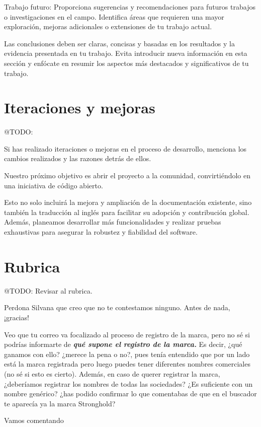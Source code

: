 Trabajo futuro: Proporciona sugerencias y recomendaciones para futuros trabajos o investigaciones en el campo.
Identifica áreas que requieren una mayor exploración, mejoras adicionales o extensiones de tu trabajo actual.

Las conclusiones deben ser claras, concisas y basadas en los resultados y la evidencia presentada en tu trabajo.
Evita introducir nueva información en esta sección y enfócate en
resumir los aspectos más destacados y significativos de tu trabajo.


\section{Iteraciones y mejoras}
\colorbox{color_highlight}{@TODO:}

Si has realizado iteraciones o mejoras en el proceso de desarrollo, menciona los cambios realizados y las razones detrás
de ellos.

Nuestro próximo objetivo es abrir el proyecto a la comunidad, convirtiéndolo en una iniciativa de código abierto.

Esto no solo incluirá la mejora y ampliación de la documentación existente, sino también la traducción al inglés para
facilitar su adopción y contribución global.
Además, planeamos desarrollar más funcionalidades y realizar pruebas exhaustivas para asegurar la robustez y fiabilidad
del software.


\section{Rubrica}
\colorbox{color_highlight}{@TODO:}
Revisar al rubrica.

Perdona Silvana que creo que no te contestamos ninguno. Antes de nada, ¡gracias!



Veo que tu correo va focalizado al proceso de registro de la marca, pero no sé si podrías informarte de
\textbf{\textit{qué supone el registro de la marca.}}
Es decir, ¿qué ganamos con ello? ¿merece la pena o no?, pues tenía entendido que por un lado está la marca registrada
pero luego puedes tener diferentes nombres comerciales (no sé si esto es cierto). Además, en caso de querer registrar la
marca, ¿deberíamos registrar los nombres de todas las sociedades? ¿Es suficiente con un nombre genérico? ¿has podido
confirmar lo que comentabas de que en el buscador te aparecía ya la marca Stronghold?


Vamos comentando


